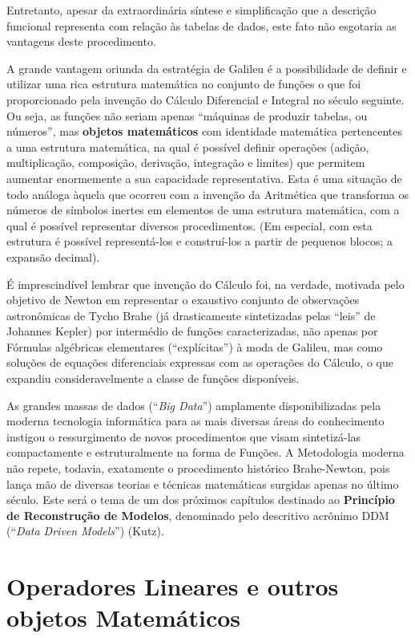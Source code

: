     Entretanto, apesar da extraordinária síntese e simplificação que a descrição funcional representa com relação às tabelas de dados, este fato não esgotaria as vantagens deste procedimento.
    
    A grande vantagem oriunda da estratégia de Galileu é a possibilidade de definir e utilizar uma rica estrutura matemática no conjunto de funções o que foi proporcionado pela invenção do Cálculo Diferencial e Integral no século seguinte. Ou seja, as funções não seriam apenas ``máquinas de produzir tabelas, ou números'', mas \textbf{objetos matemáticos} com identidade matemática pertencentes a uma estrutura matemática, na qual é possível definir operações (adição, multiplicação, composição, derivação, integração e limites) que permitem aumentar enormemente a sua capacidade representativa. Esta é uma situação de todo análoga àquela que ocorreu com a invenção da Aritmética que transforma os números de símbolos inertes em elementos de uma estrutura matemática, com a qual é possível representar diversos procedimentos. (Em especial, com esta estrutura é possível representá-los e construí-los a partir de pequenos blocos; a expansão decimal).

    É imprescindível lembrar que invenção do Cálculo foi, na verdade, motivada pelo objetivo de Newton em representar o exaustivo conjunto de observações astronômicas de Tycho Brahe (já drasticamente sintetizadas pelas ``leis'' de Johannes Kepler) por intermédio de funções caracterizadas, não apenas por Fórmulas algébricas elementares (``explícitas'') à moda de Galileu, mas como soluções de equações diferenciais expressas com as operações do Cálculo, o que expandiu consideravelmente a classe de funções disponíveis.

    As grandes massas de dados (``\textit{Big Data}'') amplamente disponibilizadas pela moderna tecnologia informática para as mais diversas áreas do conhecimento instigou o ressurgimento de novos procedimentos que visam sintetizá-las compactamente e estruturalmente na forma de Funções. A Metodologia moderna não repete, todavia, exatamente o procedimento histórico Brahe-Newton, pois lança mão de diversas teorias e técnicas matemáticas surgidas apenas no último século. Este será o tema de um dos próximos capítulos destinado ao \textbf{Princípio de Reconstrução de Modelos}, denominado pelo descritivo acrônimo DDM (``\textit{Data Driven Models}'') (Kutz).


\section{Operadores Lineares e outros objetos Matemáticos}

